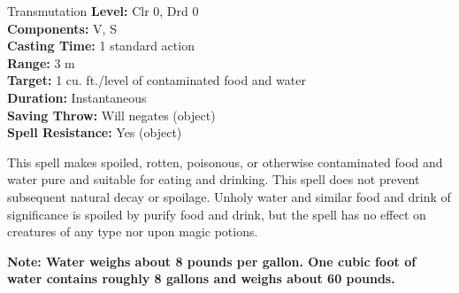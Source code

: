 {Transmutation}
{
	\textbf{Level:}
	Clr 0, Drd 0\\
	\textbf{Components:}
	V, S\\
	\textbf{Casting Time:}
	1 standard action\\
	\textbf{Range:}
	3 m\\
	\textbf{Target:}
	1 cu. ft./level of contaminated food and water\\
	\textbf{Duration:}
	Instantaneous\\
	\textbf{Saving Throw:}
	Will negates (object)\\
	\textbf{Spell Resistance:}
	Yes (object)\\
}
{
	This spell makes spoiled, rotten, poisonous, or otherwise contaminated food and water pure and suitable for eating and drinking. This spell does not prevent subsequent natural decay or spoilage. Unholy water and similar food and drink of significance is spoiled by purify food and drink, but the spell has no effect on creatures of any type nor upon magic potions.

	\textbf{Note: Water weighs about 8 pounds per gallon. One cubic foot of water contains roughly 8 gallons and weighs about 60 pounds.}

}
